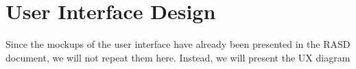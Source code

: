 \chapter{User Interface Design}
Since the mockups of the user interface have already been presented in the RASD document, we will not repeat them here. Instead, we will present the UX diagram %

